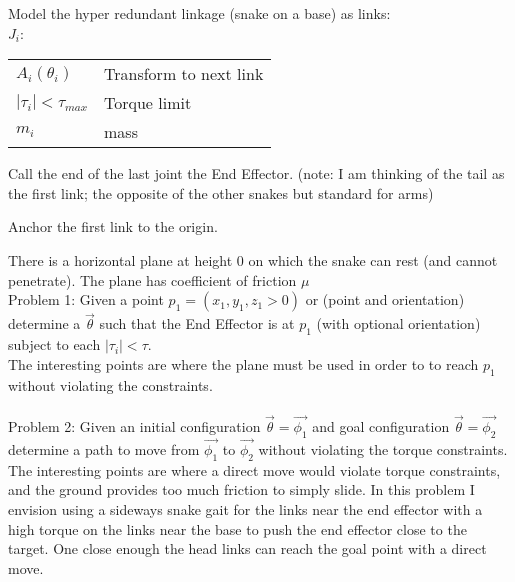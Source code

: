 \documentclass[]{scrartcl}
\begin{document}
Model the hyper redundant linkage (snake on a base) as links:\\
$J_i$: \begin{tabular}{ll}
$A_i(\theta_i)$ & Transform to next link\\
$|\tau_i| < \tau_{max}$ & Torque limit\\
$m_i$ & mass
\end{tabular}

Call the end of the last joint the End Effector. (note: I am thinking of the tail as the first link; the opposite of the other snakes but standard for arms)

Anchor the first link to the origin. 

There is a horizontal plane at height 0 on which the snake can rest (and cannot penetrate). The plane has coefficient of friction $\mu$\\

Problem 1: Given a point $p_1 = (x_1, y_1, z_1>0)$ or (point and orientation) determine a $\vec{\theta}$ such that the End Effector is at $p_1$ (with optional orientation) subject to each $|\tau_i| < \tau$. \\
The interesting points are where the plane must be used in order to to reach $p_1$ without violating the constraints.\\
\\

Problem 2: Given an initial configuration $\vec{\theta} = \vec{\phi_1}$ and goal configuration $\vec{\theta} = \vec{\phi_2}$ determine a path to move from $\vec{\phi_1}$ to $\vec{\phi_2}$ without violating the torque constraints.\\

The interesting points are where a direct move would violate torque constraints, and the ground provides too much friction to simply slide. In this problem I envision using a sideways snake gait for the links near the end effector with a high torque on the links near the base to push the end effector close to the target. One close enough the head links can reach the goal point with a direct move.
\end{document}
